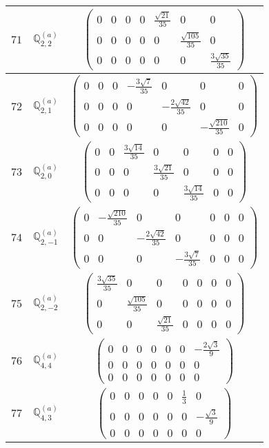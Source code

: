 \documentclass[fleqn,8pt,landscape]{jsarticle}
\begin{document}
\begin{center}
\begin{longtable}{ccc}
$ 71 $ & $ \mathbb{Q}_{2,2}^{(a)} $ & $ \begin{pmatrix} 0 & 0 & 0 & 0 & \frac{\sqrt{21}}{35} & 0 & 0 \\ 0 & 0 & 0 & 0 & 0 & \frac{\sqrt{105}}{35} & 0 \\ 0 & 0 & 0 & 0 & 0 & 0 & \frac{3 \sqrt{35}}{35} \end{pmatrix} $ \\ \hline
$ 72 $ & $ \mathbb{Q}_{2,1}^{(a)} $ & $ \begin{pmatrix} 0 & 0 & 0 & - \frac{3 \sqrt{7}}{35} & 0 & 0 & 0 \\ 0 & 0 & 0 & 0 & - \frac{2 \sqrt{42}}{35} & 0 & 0 \\ 0 & 0 & 0 & 0 & 0 & - \frac{\sqrt{210}}{35} & 0 \end{pmatrix} $ \\ \hline
$ 73 $ & $ \mathbb{Q}_{2,0}^{(a)} $ & $ \begin{pmatrix} 0 & 0 & \frac{3 \sqrt{14}}{35} & 0 & 0 & 0 & 0 \\ 0 & 0 & 0 & \frac{3 \sqrt{21}}{35} & 0 & 0 & 0 \\ 0 & 0 & 0 & 0 & \frac{3 \sqrt{14}}{35} & 0 & 0 \end{pmatrix} $ \\ \hline
$ 74 $ & $ \mathbb{Q}_{2,-1}^{(a)} $ & $ \begin{pmatrix} 0 & - \frac{\sqrt{210}}{35} & 0 & 0 & 0 & 0 & 0 \\ 0 & 0 & - \frac{2 \sqrt{42}}{35} & 0 & 0 & 0 & 0 \\ 0 & 0 & 0 & - \frac{3 \sqrt{7}}{35} & 0 & 0 & 0 \end{pmatrix} $ \\ \hline
$ 75 $ & $ \mathbb{Q}_{2,-2}^{(a)} $ & $ \begin{pmatrix} \frac{3 \sqrt{35}}{35} & 0 & 0 & 0 & 0 & 0 & 0 \\ 0 & \frac{\sqrt{105}}{35} & 0 & 0 & 0 & 0 & 0 \\ 0 & 0 & \frac{\sqrt{21}}{35} & 0 & 0 & 0 & 0 \end{pmatrix} $ \\ \hline
$ 76 $ & $ \mathbb{Q}_{4,4}^{(a)} $ & $ \begin{pmatrix} 0 & 0 & 0 & 0 & 0 & 0 & - \frac{2 \sqrt{3}}{9} \\ 0 & 0 & 0 & 0 & 0 & 0 & 0 \\ 0 & 0 & 0 & 0 & 0 & 0 & 0 \end{pmatrix} $ \\ \hline
$ 77 $ & $ \mathbb{Q}_{4,3}^{(a)} $ & $ \begin{pmatrix} 0 & 0 & 0 & 0 & 0 & \frac{1}{3} & 0 \\ 0 & 0 & 0 & 0 & 0 & 0 & - \frac{\sqrt{3}}{9} \\ 0 & 0 & 0 & 0 & 0 & 0 & 0 \end{pmatrix} $ \\ \hline

\end{longtable}
\end{center}
\end{document}
